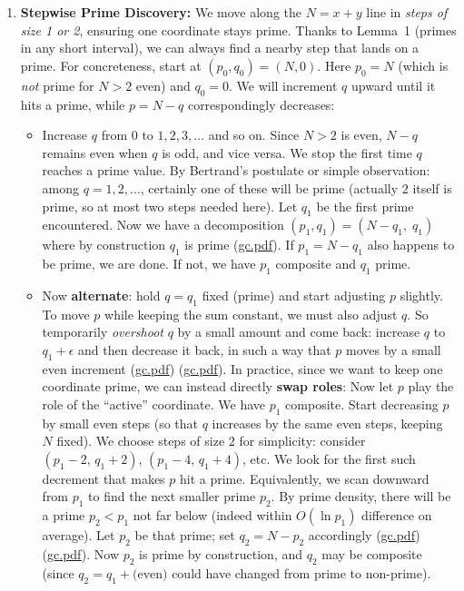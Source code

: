 \documentclass[12pt]{article}
\begin{document}
\begin{enumerate}[leftmargin=*, label=\arabic*.]
  \item \textbf{Stepwise Prime Discovery:} We move along the $N=x+y$ line in \emph{steps of size 1 or 2}, ensuring one coordinate stays prime. Thanks to Lemma~1 (primes in any short interval), we can always find a nearby step that lands on a prime. For concreteness, start at $(p_0,q_0) = (N,0)$. Here $p_0=N$ (which is \emph{not} prime for $N>2$ even) and $q_0=0$. We will increment $q$ upward until it hits a prime, while $p=N-q$ correspondingly decreases:
  \begin{itemize}[leftmargin=*,label={--}]
    \item Increase $q$ from $0$ to $1,2,3,\dots$ and so on. Since $N>2$ is even, $N-q$ remains even when $q$ is odd, and vice versa. We stop the first time $q$ reaches a prime value. By Bertrand’s postulate or simple observation: among $q=1,2,\dots$, certainly one of these will be prime (actually $2$ itself is prime, so at most two steps needed here). Let $q_1$ be the first prime encountered. Now we have a decomposition $(p_1,q_1)=(N-q_1,\;q_1)$ where by construction $q_1$ is prime (\href{file://file-7ZYYwSHWVa83XEVTrEhg5z#:~:text=%24,over%20short%20intervals%2C%20we%20expect}{gc.pdf}). If $p_1 = N-q_1$ also happens to be prime, we are done. If not, we have $p_1$ composite and $q_1$ prime.
    \item Now \textbf{alternate}: hold $q=q_1$ fixed (prime) and start adjusting $p$ slightly. To move $p$ while keeping the sum constant, we must also adjust $q$. So temporarily \emph{overshoot} $q$ by a small amount and come back: increase $q$ to $q_1 + \epsilon$ and then decrease it back, in such a way that $p$ moves by a small even increment (\href{file://file-7ZYYwSHWVa83XEVTrEhg5z#:~:text=adjusting%20%24x%24%20slightly%20by%20using,of%20primes%20again%2C%20there%20will}{gc.pdf}) (\href{file://file-7ZYYwSHWVa83XEVTrEhg5z#:~:text=actually%20this%20path%20is%20trivial,is%20prime%20at%20different%20segments}{gc.pdf}). In practice, since we want to keep one coordinate prime, we can instead directly \textbf{swap roles}: Now let $p$ play the role of the “active” coordinate. We have $p_1$ composite. Start decreasing $p$ by small even steps (so that $q$ increases by the same even steps, keeping $N$ fixed). We choose steps of size $2$ for simplicity: consider $(p_1-2,\,q_1+2)$, $(p_1-4,\,q_1+4)$, etc. We look for the first such decrement that makes $p$ hit a prime. Equivalently, we scan downward from $p_1$ to find the next smaller prime $p_2$. By prime density, there will be a prime $p_2 < p_1$ not far below (indeed within $O(\ln p_1)$ difference on average). Let $p_2$ be that prime; set $q_2 = N-p_2$ accordingly (\href{file://file-7ZYYwSHWVa83XEVTrEhg5z#:~:text=%E2%80%9Cone,a%20sequence%20of%20candidate%20pairs}{gc.pdf}) (\href{file://file-7ZYYwSHWVa83XEVTrEhg5z#:~:text=coordinate%20while%20adjusting%20the%20other,from%20the%20other%20end%3A%20let}{gc.pdf}). Now $p_2$ is prime by construction, and $q_2$ may be composite (since $q_2 = q_1 + \text{(even)}$ could have changed from prime to non-prime).

\end{itemize}
\end{enumerate}
\end{document}
